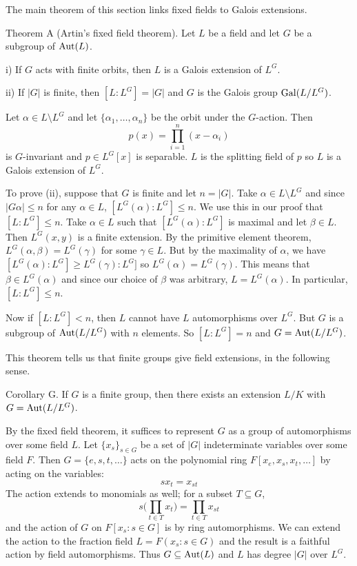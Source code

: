 The main theorem of this section links fixed fields to Galois extensions.

\parenproclaim Theorem A (Artin's fixed field theorem). Let $L$ be a field and let $G$ be a subgroup of $\mathop {\rm Aut}(L)$.
\medskip
\item{i)} If $G$ acts with finite orbits, then $L$ is a Galois extension of $L^G$.
\smallskip
\item{ii)} If $|G|$ is finite, then $[L:L^G] = |G|$ and $G$ is the Galois group $\mathop {\rm Gal}(L/L^G)$.
\medskip

\proof Let $\alpha \in L\setminus L^G$ and let $\{\alpha_1,\ldots,\alpha_n\}$ be the orbit under the $G$-action. Then
$$p(x) = \prod_{i=1}^n (x-\alpha_i)$$
is $G$-invariant and $p\in L^G[x]$ is separable. $L$ is the splitting field of $p$ so $L$ is a Galois extension of $L^G$.

To prove (ii), suppose that $G$ is finite and let $n=|G|$. Take $\alpha\in L\setminus L^G$ and since $|G\alpha|\leq n$ for any $\alpha\in L$, $[L^G(\alpha) : L^G] \leq n$. We use this in our proof that $[L:L^G] \leq n$. Take $\alpha\in L$ such that $[L^G(\alpha):L^G]$ is maximal and let $\beta\in L$. Then $L^G(x,y)$ is a finite extension. By the primitive element theorem, $L^G(\alpha,\beta) = L^G(\gamma)$ for some $\gamma\in L$. But by the maximality of $\alpha$, we have $[L^G(\alpha):L^G]\geq L^G(\gamma):L^G]$ so $L^G(\alpha) = L^G(\gamma)$. This means that $\beta\in L^G(\alpha)$ and since our choice of $\beta$ was arbitrary, $L = L^G(\alpha)$. In particular, $[L:L^G]\leq n$.

Now if $[L:L^G] < n$, then $L$ cannot have $L$ automorphisms over $L^G$. But $G$ is a subgroup of $\mathop {\rm Aut}(L/L^G)$ with $n$ elements. So $[L:L^G] = n$ and $G = \mathop {\rm Aut}(L/L^G)$.\slug

This theorem tells us that finite groups give field extensions, in the following sense.

\proclaim Corollary G. If $G$ is a finite group, then there exists an extension $L/K$ with $G = \mathop {\rm Aut}(L/L^G)$.

\proof By the fixed field theorem, it suffices to represent $G$ as a group of automorphisms over some field $L$. Let $\{x_s\}_{s\in G}$ be a set of $|G|$ indeterminate variables over some field $F$. Then $G = \{e,s,t,\ldots\}$ acts on the polynomial ring $F[x_e,x_s,x_t,\ldots]$ by acting on the variables:
$$sx_t = x_{st}$$
The action extends to monomials as well; for a subset $T\subseteq G$,
$$s\Big(\prod_{t\in T} x_t\Big) = \prod_{t\in T} x_{st}$$
and the action of $G$ on $F[x_s : s\in G]$ is by ring automorphisms. We can extend the action to the fraction field $L = F(x_s : s\in G)$ and the result is a faithful action by field automorphisms. Thus $G\subseteq \mathop {\rm Aut}(L)$ and $L$ has degree $|G|$ over $L^G$.\slug


